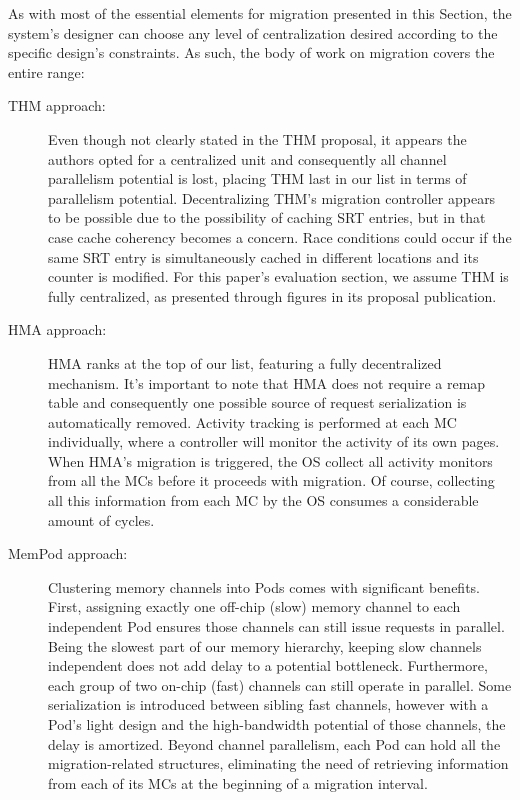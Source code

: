 As with most of the essential elements for migration presented in this Section, the system's designer can choose any level of centralization desired according to the specific design's constraints. As such, the body of work on migration covers the entire range:
\begin{description}
	\item[THM approach:] Even though not clearly stated in the THM proposal, it appears the authors opted for a centralized unit and consequently all channel parallelism potential is lost, placing THM last in our list in terms of parallelism potential. Decentralizing THM's migration controller appears to be possible due to the possibility of caching SRT entries, but in that case cache coherency becomes a concern. Race conditions could occur if the same SRT entry is simultaneously cached in different locations and its counter is modified. For this paper's evaluation section, we assume THM is fully centralized, as presented through figures in its proposal publication.
	\item[HMA approach:] HMA ranks at the top of our list, featuring a fully decentralized mechanism. It's important to note that HMA does not require a remap table and consequently one possible source of request serialization is automatically removed. Activity tracking is performed at each MC individually, where a controller will monitor the activity of its own pages. When HMA's migration is triggered, the OS collect all activity monitors from all the MCs before it proceeds with migration. Of course, collecting all this information from each MC by the OS consumes a considerable amount of cycles.
	\item[MemPod approach:] Clustering memory channels into Pods comes with significant benefits. First, assigning exactly one off-chip (slow) memory channel to each independent Pod ensures those channels can still issue requests in parallel. Being the slowest part of our memory hierarchy, keeping slow channels independent does not add delay to a potential bottleneck. Furthermore, each group of two on-chip (fast) channels can still operate in parallel. Some serialization is introduced between sibling fast channels, however with a Pod's light design and the high-bandwidth potential of those channels, the delay is amortized. Beyond channel parallelism, each Pod can hold all the migration-related structures, eliminating the need of retrieving information from each of its MCs at the beginning of a migration interval. 
\end{description}

